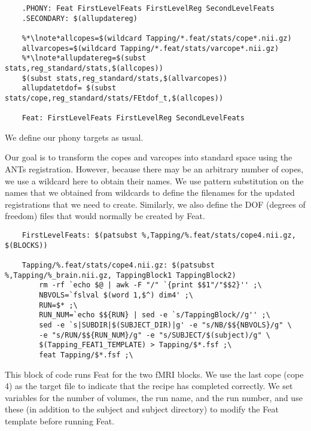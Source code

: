 \begin{lstlisting}
	.PHONY: Feat FirstLevelFeats FirstLevelReg SecondLevelFeats
	.SECONDARY: $(allupdatereg)

	%*\lnote*allcopes=$(wildcard Tapping/*.feat/stats/cope*.nii.gz)
	allvarcopes=$(wildcard Tapping/*.feat/stats/varcope*.nii.gz)
	%*\lnote*allupdatereg=$(subst stats,reg_standard/stats,$(allcopes)) 
	$(subst stats,reg_standard/stats,$(allvarcopes))
	allupdatetdof= $(subst stats/cope,reg_standard/stats/FEtdof_t,$(allcopes)) 

	Feat: FirstLevelFeats FirstLevelReg SecondLevelFeats
\end{lstlisting}
We define our phony targets as usual. 

Our goal is to transform the copes and varcopes into standard space
using the ANTs registration.  However, because there may be an
arbitrary number of copes, we use a wildcard here to obtain their
names.  We use pattern substitution on the names that we
obtained from wildcards to define the filenames for the updated
registrations that we need to create. Similarly, we also define the
DOF (degrees of freedom) files that would normally be created by Feat.


\begin{lstlisting}
	FirstLevelFeats: $(patsubst %,Tapping/%.feat/stats/cope4.nii.gz, $(BLOCKS))

	Tapping/%.feat/stats/cope4.nii.gz: $(patsubst %,Tapping/%_brain.nii.gz, TappingBlock1 TappingBlock2)
		rm -rf `echo $@ | awk -F "/" `{print $$1"/"$$2}'' ;\
		NBVOLS=`fslval $(word 1,$^) dim4' ;\
		RUN=$* ;\
		RUN_NUM=`echo $${RUN} | sed -e `s/TappingBlock//g'' ;\
		sed -e `s|SUBDIR|$(SUBJECT_DIR)|g' -e "s/NB/$${NBVOLS}/g" \
		-e "s/RUN/$${RUN_NUM}/g" -e "s/SUBJECT/$(subject)/g" \
		$(Tapping_FEAT1_TEMPLATE) > Tapping/$*.fsf ;\
		feat Tapping/$*.fsf ;\

\end{lstlisting}
This block of code runs Feat for the two fMRI blocks. We use the last
cope (cope 4) as the target file to indicate that the recipe has
completed correctly. We set variables for the number of volumes, the
run name, and the run number, and use these (in addition to the
subject and subject directory) to modify the Feat template before
running Feat.



